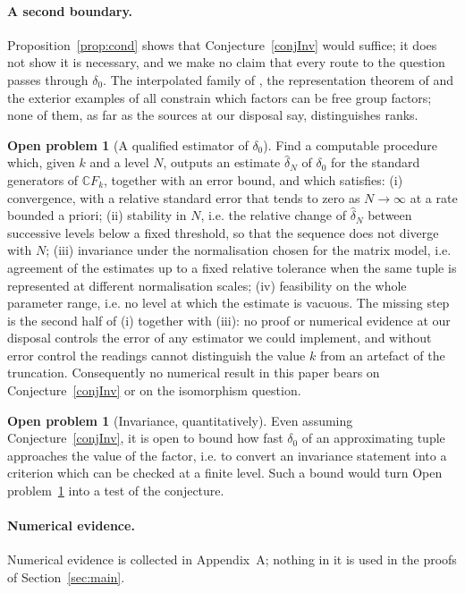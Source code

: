 \documentclass[11pt]{article}
\theoremstyle{plain}
\theoremstyle{definition}
\newtheorem{openproblem}[theorem]{Open problem}
\theoremstyle{remark}
\newcommand{\C}{\mathbb{C}}\newcommand{\N}{\mathbb{N}}
\begin{document}
\paragraph{A second boundary.} Proposition~\ref{prop:cond} shows that Conjecture~\ref{conjInv} would suffice; it does not show it is necessary, and we make no claim that every route to the question passes through $\delta_0$. The interpolated family of \cite{Dyk94}, the representation theorem of \cite{PS20} and the exterior examples of \cite{Hou09} all constrain which factors can be free group factors; none of them, as far as the sources at our disposal say, distinguishes ranks.

\begin{openproblem}[A qualified estimator of $\delta_0$]\label{op:estimator}
Find a computable procedure which, given $k$ and a level $N$, outputs an estimate $\hat\delta_N$ of $\delta_0$ for the standard generators of $\C F_k$, together with an error bound, and which satisfies: (i) convergence, with a relative standard error that tends to zero as $N\to\infty$ at a rate bounded a priori; (ii) stability in $N$, i.e. the relative change of $\hat\delta_N$ between successive levels below a fixed threshold, so that the sequence does not diverge with $N$; (iii) invariance under the normalisation chosen for the matrix model, i.e. agreement of the estimates up to a fixed relative tolerance when the same tuple is represented at different normalisation scales; (iv) feasibility on the whole parameter range, i.e. no level at which the estimate is vacuous. The missing step is the second half of (i) together with (iii): no proof or numerical evidence at our disposal controls the error of any estimator we could implement, and without error control the readings cannot distinguish the value $k$ from an artefact of the truncation. Consequently no numerical result in this paper bears on Conjecture~\ref{conjInv} or on the isomorphism question.
\end{openproblem}

\begin{openproblem}[Invariance, quantitatively]\label{op:quant}
Even assuming Conjecture~\ref{conjInv}, it is open to bound how fast $\delta_0$ of an approximating tuple approaches the value of the factor, i.e. to convert an invariance statement into a criterion which can be checked at a finite level. Such a bound would turn Open problem~\ref{op:estimator} into a test of the conjecture.
\end{openproblem}

\paragraph{Numerical evidence.} Numerical evidence is collected in Appendix~A; nothing in it is used in the proofs of Section~\ref{sec:main}.
\end{document}
